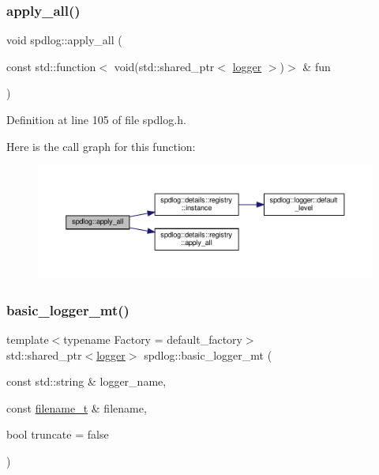 \subsubsection{\texorpdfstring{apply\+\_\+all()}{apply\_all()}}
{\footnotesize\ttfamily void spdlog\+::apply\+\_\+all (\begin{DoxyParamCaption}\item[{const std\+::function$<$ void(std\+::shared\+\_\+ptr$<$ \hyperlink{classspdlog_1_1logger}{logger} $>$)$>$ \&}]{fun }\end{DoxyParamCaption})\hspace{0.3cm}{\ttfamily [inline]}}



Definition at line 105 of file spdlog.\+h.

Here is the call graph for this function\+:
\nopagebreak
\begin{figure}[H]
\begin{center}
\leavevmode
\includegraphics[width=350pt]{namespacespdlog_a33b888a87a0fccc7b7dd5b89413ce6b7_cgraph}
\end{center}
\end{figure}
\mbox{\label{namespacespdlog_abd73a6177edaccb77048bf47e3f8ad23}} 
\subsubsection{\texorpdfstring{basic\+\_\+logger\+\_\+mt()}{basic\_logger\_mt()}}
{\footnotesize\ttfamily template$<$typename Factory  = default\+\_\+factory$>$ \\
std\+::shared\+\_\+ptr$<$\hyperlink{classspdlog_1_1logger}{logger}$>$ spdlog\+::basic\+\_\+logger\+\_\+mt (\begin{DoxyParamCaption}\item[{const std\+::string \&}]{logger\+\_\+name,  }\item[{const \hyperlink{namespacespdlog_acf7ce125b3622e44f8f1702d699e0b06}{filename\+\_\+t} \&}]{filename,  }\item[{bool}]{truncate = {\ttfamily false} }\end{DoxyParamCaption})\hspace{0.3cm}{\ttfamily [inline]}}



